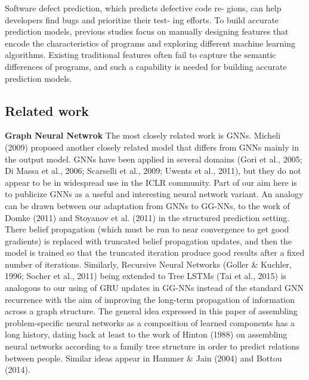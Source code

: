 \documentclass{article}
\begin{document}
Software defect prediction, which predicts defective code re- gions, can help developers find bugs and prioritize their test- ing efforts. To build accurate prediction models, previous studies focus on manually designing features that encode the characteristics of programs and exploring different machine learning algorithms. Existing traditional features often fail to capture the semantic differences of programs, and such a capability is needed for building accurate prediction models.
\subsection{Related work}

\textbf{Graph Neural Netwrok}
The most closely related work is GNNs. Micheli (2009) proposed another closely related model that differs from GNNs mainly in the output model. GNNs have been applied in several domains (Gori et al., 2005; Di Massa et al., 2006; Scarselli et al., 2009; Uwents et al., 2011), but they do not appear to be in widespread use in the ICLR community. Part of our aim here is to publicize GNNs as a useful and interesting neural network variant.
An analogy can be drawn between our adaptation from GNNs to GG-NNs, to the work of Domke (2011) and Stoyanov et al. (2011) in the structured prediction setting. There belief propagation (which must be run to near convergence to get good gradients) is replaced with truncated belief propagation updates, and then the model is trained so that the truncated iteration produce good results after a fixed number of iterations. Similarly, Recursive Neural Networks (Goller & Kuchler, 1996; Socher et al., 2011) being extended to Tree LSTMs (Tai et al., 2015) is analogous to our using of GRU updates in GG-NNs instead of the standard GNN recurrence with the aim of improving the long-term propagation of information across a graph structure. The general idea expressed in this paper of assembling problem-specific neural networks as a composition of learned components has a long history, dating back at least to the work of Hinton (1988) on assembling neural networks according to a family tree structure in order to predict relations between people. Similar ideas appear in Hammer & Jain (2004) and Bottou (2014).
\end{document}
